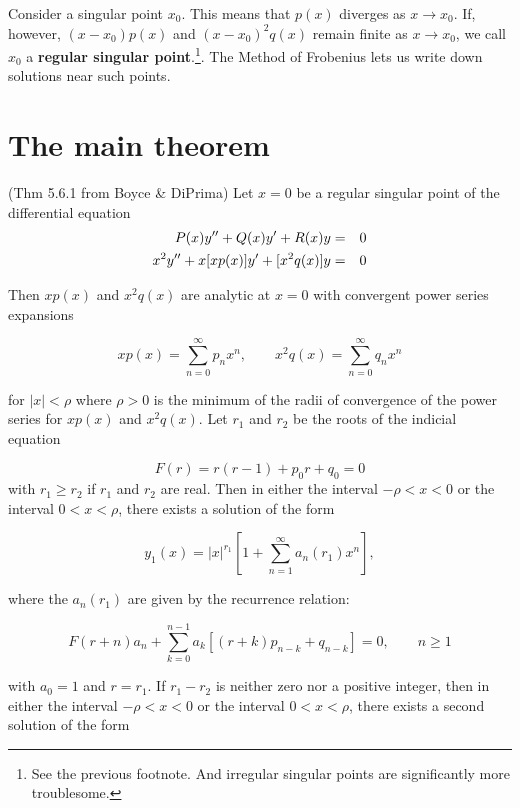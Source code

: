 \documentclass[12pt]{article}
\begin{document}
Consider a singular point $x_0$. This means that $p(x)$ diverges as $x
\to x_0$. If, however, $(x-x_0)p(x)$ and $(x-x_0)^2q(x)$ remain finite
as $x \to x_0$, we call $x_0$ a {\bf regular singular
  point}.\footnote{See the previous footnote. And irregular singular
  points are significantly more troublesome.}. The Method of Frobenius
lets us write down solutions near such points.

\newpage
\section{The main theorem}

(Thm 5.6.1 from Boyce \& DiPrima) Let  $x=0$ be a regular singular point of the differential
equation 
\begin{eqnarray}
  P(x)y'' + Q(x)y' + R(x)y &=& 0 \notag\\
  \label{fe}
  x^2y'' + x[x p(x)]y' + [x^2q(x)]y &=& 0
\end{eqnarray}

\noindent Then $xp(x)$ and $x^2q(x)$
are analytic at $x=0$ with convergent power series expansions

\begin{equation}
  xp(x)=\sum_{n=0}^{\infty}p_nx^n,\qquad  x^2q(x)=\sum_{n=0}^{\infty}q_nx^n
\end{equation}

for $|x|<\rho$ where $\rho>0$ is the minimum of the radii of
convergence of the power series for $xp(x)$ and $x^2q(x)$. Let $r_1$
and $r_2$ be the roots of the indicial equation

\begin{equation}
  \label{ind}
  F(r) = r(r-1) + p_0r + q_0 = 0
\end{equation}
 with $r_1 \ge r_2$ if $r_1$ and $r_2$ are real. Then in either the
 interval $-\rho < x < 0$ or the interval $0 < x < \rho$, there exists
 a solution of the form


\begin{equation}
  \label{y1}
  y_1(x) = |x|^{r_1}\left [ 1 + \sum_{n=1}^{\infty}a_n(r_1)x^n \right ],
\end{equation}

where the $a_n(r_1)$ are given by the recurrence relation:

\begin{equation}
  \label{recurrence}
  F(r+n)a_n + \sum_{k=0}^{n-1}a_k[(r+k)p_{n-k}+q_{n-k}]=0,\qquad n\ge1
\end{equation}

with $a_0=1$ and $r=r_1$.  If $r_1-r_2$ is neither zero nor a positive
integer, then in either the interval $-\rho < x < 0$ or the interval
$0 < x < \rho$, there exists a second solution of the form
\end{document}
